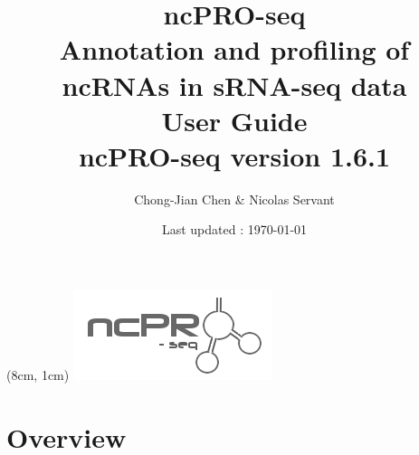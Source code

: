 \documentclass[12pt]{article}
\title{\vspace{7cm}\textbf{ncPRO-seq}\\\normalsize  Annotation and profiling of ncRNAs in sRNA-seq data\\\vspace{1cm}\large{\bf{User Guide}}\\\vspace{1cm} \normalsize ncPRO-seq version 1.6.1}
\date{\normalsize Last updated : \today}
\author{Chong-Jian Chen \& Nicolas Servant}
\begin{document}
\begin{titlepage}
\begin{center}
\begin{textblock*}{3cm}(8cm, 1cm)
\includegraphics[scale=0.8]{pic/ncPRO_logo.png}
\end{textblock*}
\end{center}
\end{titlepage}

\maketitle
\newpage

\tableofcontents
\clearpage
\section{Overview}
\end{document}
